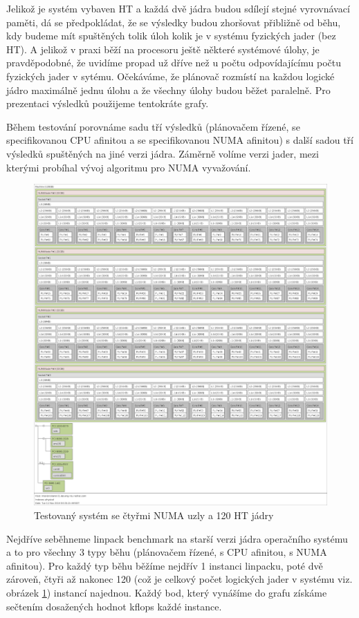\documentclass[
  master=true,
  font=sans,
  printversion=false,
  joinlists=true,
  figures=true,
  tables=true,
  sourcecodes=false,
  theorems=false,
  bibencoding=utf8,
  language=czech,
  encoding=utf8,
  field=ainfk,
  biblatex,
  glossaries,
  index
]{kidiplom}
\begin{document}
Jelikož je systém vybaven HT a každá dvě jádra budou sdílejí stejné vyrovnávací paměti, dá se předpokládat, že se výsledky budou zhoršovat přibližně od běhu, kdy budeme mít spuštěných tolik úloh kolik je v systému fyzických jader (bez HT). A jelikož v praxi běží na procesoru ještě některé systémové úlohy, je pravděpodobné, že uvidíme propad už dříve než u počtu odpovídajícímu počtu fyzických jader v sytému. Očekáváme, že plánovač rozmístí na každou logické jádro maximálně jednu úlohu a že všechny úlohy budou běžet paralelně. Pro prezentaci výsledků použijeme tentokráte grafy.

Během testování porovnáme sadu tří výsledků (plánovačem řízené, se specifikovanou CPU afinitou a se specifikovanou NUMA afinitou) s další sadou tří výsledků spuštěných na jiné verzi jádra. Záměrně volíme verzi jader, mezi kterými probíhal vývoj algoritmu pro NUMA vyvažování.

\begin{figure}[p]
\includegraphics[scale=0.2]{obrazky/lsTOPO-brickland.png}
\caption{Testovaný systém se čtyřmi NUMA uzly a 120 HT jádry}
\label{4 numa NODE system scheme}
\end{figure}


Nejdříve seběhneme linpack benchmark na starší verzi jádra operačního systému a to pro všechny 3 typy běhu (plánovačem řízené, s CPU afinitou, s NUMA afinitou). Pro každý typ běhu běžíme nejdřív 1 instanci linpacku, poté dvě zároveň, čtyři až nakonec 120 (což je celkový počet logických jader v systému viz. obrázek \ref{4 numa NODE system scheme}) instancí najednou. Každý bod, který vynášíme do grafu získáme sečtením dosažených hodnot kflops každé instance.
\end{document}

